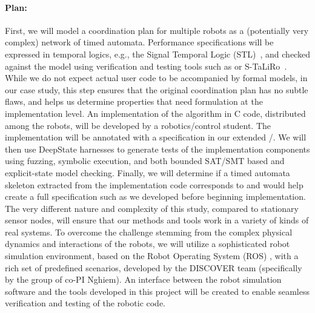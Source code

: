 \paragraph{Plan:}
First, we will model a coordination plan %
  for multiple robots as a (potentially very complex) network of timed automata.
  Performance specifications will be expressed in temporal logics, e.g., the Signal Temporal Logic (STL)~\cite{donze2010robust}, and checked against the model using verification and testing tools such as \uppaal or S-TaLiRo~\cite{annpureddy2011s}.
  While we do not expect actual user code to be accompanied by formal models, in our case study, this step ensures that the original coordination plan has no subtle flaws, and helps us determine properties that need formulation at the implementation level.
  An implementation of the algorithm in C code, distributed among the robots, will be developed by a robotics/control student.
  The implementation will be annotated with a specification in our extended \acsl/\eacsl.
  We will then use DeepState harnesses to generate tests of the implementation components using fuzzing, symbolic execution, and both bounded SAT/SMT based and explicit-state model checking.
  Finally, we will determine if a timed automata skeleton extracted from the implementation code corresponds to and would help create a full specification such as we developed before beginning implementation.
  The very different nature and complexity of this study, compared to stationary sensor nodes, will ensure that our methods and tools work in a variety of kinds of real systems.
  To overcome the challenge stemming from the complex physical dynamics and interactions of the robots, we will utilize a sophisticated robot simulation environment, based on the Robot Operating System (ROS) \cite{ROS}, with a rich set of predefined scenarios, developed by the DISCOVER team (specifically by the group of co-PI Nghiem).
  An interface between the robot simulation software and the tools developed in this project will be created to enable seamless verification and testing of the robotic code.



